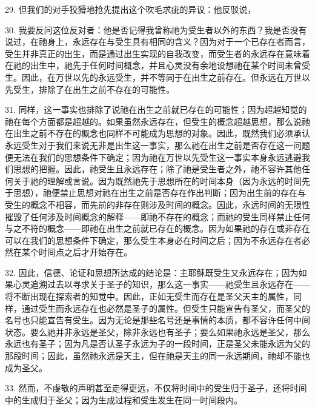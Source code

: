 29. 但我们的对手狡猾地抢先提出这个吹毛求疵的异议：他反驳说，\par

30. 我要反问这位反对者：他是否记得我曾称祂为受生者以外的东西？我是否没有说过，在祂身上，永远存在与受生具有相同的含义？因为对于一个已存在者而言，受生并非真正的出生，而是通过出生实现的自我改变，而受生者的永远存在意味着在祂的出生中，祂先于任何时间概念，并且心灵没有余地设想祂在某个时间未曾受生。因此，在万世以先的永远受生，并不等同于在出生之前存在。但永远在万世以先受生，排除了在出生之前不存在的可能性。\par

31. 同样，这一事实也排除了说祂在出生之前就已存在的可能性；因为超越知觉的祂在每个方面都是超越的。如果虽然永远存在，但受生的概念超越思想，那么说祂在出生之前不存在的概念也同样不可能成为思想的对象。因此，既然我们必须承认永远受生对于我们来说无非是出生这一事实，那么祂在出生之前是否存在这一问题便无法在我们的思想条件下确定；因为祂在万世以先受生这一事实本身永远逃避我们思想的把握。因此，祂受生且永远存在；除了祂是受生者之外，祂不容许其他任何关于祂的理解或言说。因为既然祂先于思想所在的时间本身（因为永远的时间先于思想），祂便禁止思想对祂在出生之前是否存在作出判断；因为出生前的存在与受生的概念不相容，而先前的非存在则涉及时间的概念。因此，永远时间的无限性摧毁了任何涉及时间概念的解释——即祂不存在的概念；而祂的受生同样禁止任何与之不符的概念——即祂在出生之前就已存在的概念。因为如果祂的存在或非存在可以在我们的思想条件下确定，那么受生本身必在时间之后；因为不永远存在者必然在某个时间点之后才开始存在。\par

32. 因此，信德、论证和思想所达成的结论是：主耶稣既受生又永远存在；因为如果心灵追溯过去以寻求关于圣子的知识，那么这一事实——祂受生且永远存在——将不断出现在探索者的知觉中。因此，正如无受生而存在是圣父天主的属性，同样，通过受生而永远存在也必然是圣子的属性。但受生只能宣告有圣父，而圣父的名号也只能宣告有受生。因为无论是那些名号还是事情的本质，都不容许任何中间状态。要么祂并非永远是圣父，除非永远也有圣子；要么如果祂永远是圣父，那么永远也有圣子；因为凡是否认圣子永远为子的一段时间，正是圣父未能永远为父的那段时间；因此，虽然祂永远是天主，但在祂是天主的同一永远期间，祂却不能也成为圣父。\par

33. 然而，不虔敬的声明甚至走得更远，不仅将时间中的受生归于圣子，还将时间中的生成归于圣父；因为生成过程和受生发生在同一时间段内。\par

